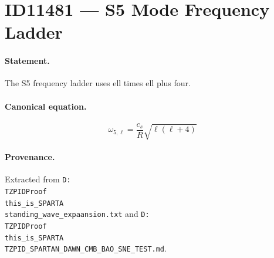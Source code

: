 \section*{ID11481 --- S5 Mode Frequency Ladder}

\paragraph{Statement.}
The S5 frequency ladder uses ell times ell plus four.

\paragraph{Canonical equation.}
\[
\omega_{5,\ell}=\frac{c_s}{R}\sqrt{\ell(\ell+4)}
\]

\paragraph{Provenance.}
Extracted from \texttt{D:\\TZPIDProof\\this\_is\_SPARTA\\standing\_wave\_expaansion.txt} and \texttt{D:\\TZPIDProof\\this\_is\_SPARTA\\TZPID\_SPARTAN\_DAWN\_CMB\_BAO\_SNE\_TEST.md}.
